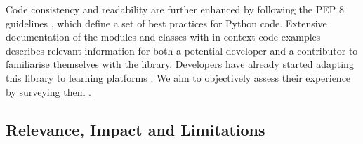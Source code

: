 \documentclass[letterpaper]{article} %
\begin{document}

Code consistency and readability are further enhanced by following the PEP 8 guidelines \cite{pep8}, which define a set of best practices for Python code. Extensive documentation
of the modules and classes with in-context code examples describes relevant information for both a potential developer and a contributor to familiarise themselves with the library. Developers have already started adapting this library to learning platforms \cite{x5learn}. We aim to objectively assess their experience by surveying them \cite{piccioni2013empirical,nadi2023selecting}.  




\subsection{Relevance, Impact and Limitations}
\end{document}
